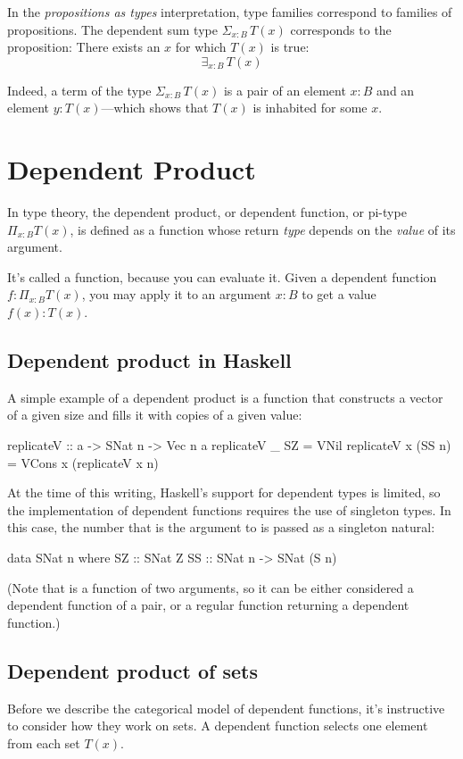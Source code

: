 \documentclass[DaoFP]{subfiles}
\begin{document}
In the \emph{propositions as types} interpretation, type families correspond to families of propositions. The dependent sum type $\Sigma_{x : B} \, T(x)$ corresponds to the proposition: There exists an $x$ for which $T(x)$ is true:
\[ \exists_{x : B} \, T (x)\]

Indeed, a term of the type $\Sigma_{x : B} \, T(x)$ is a pair of an element $x \colon B$ and an element $y \colon T(x)$---which shows that $T(x)$ is inhabited for some $x$.

\section{Dependent Product}

In type theory, the dependent product, or dependent function, or pi-type $\Pi_{x:B} T(x)$, is defined as a function whose return \emph{type} depends on the \emph{value} of its argument. 

It's called a function, because you can evaluate it. Given a dependent function  $f \colon \Pi_{x:B} T(x)$, you may apply it to an argument $x\colon B$ to get a value $f(x) \colon T(x)$.

\subsection{Dependent product in Haskell}
A simple example of a dependent product is a function that constructs a vector of a given size and fills it with copies of a given value:
\begin{haskell}
replicateV :: a -> SNat n -> Vec n a
replicateV _ SZ  = VNil
replicateV x (SS n) = VCons x (replicateV x n)
\end{haskell}

At the time of this writing, Haskell's support for dependent types is limited, so the implementation of dependent functions requires the use of singleton types. In this case, the number that is the argument to  is passed as a singleton natural:
\begin{haskell}
data SNat n where
  SZ :: SNat Z
  SS :: SNat n -> SNat (S n)
\end{haskell}
(Note that  is a function of two arguments, so it can be either considered a dependent function of a pair, or a regular function returning a dependent function.)
\subsection{Dependent product of sets}
Before we describe the categorical model of dependent functions, it's instructive to consider how they work on sets. A dependent function selects one element from each set $T(x)$. 
\end{document}

